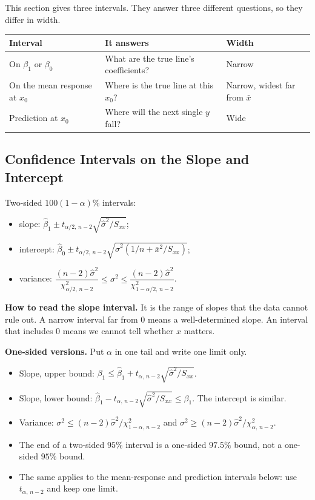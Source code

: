 This section gives three intervals. They answer three different questions, so they differ in width.

\begin{center}
\begin{tabular}{lll}
\toprule
Interval & It answers & Width\\
\midrule
On $\beta_1$ or $\beta_0$ & What are the true line's coefficients? & Narrow\\
On the mean response at $x_0$ & Where is the true line at this $x_0$? & Narrow, widest far from $\bar{x}$\\
Prediction at $x_0$ & Where will the next single $y$ fall? & Wide\\
\bottomrule
\end{tabular}
\end{center}

\subsection{Confidence Intervals on the Slope and Intercept}

\begin{theorem}\label{thm:regci}
Two-sided $100(1-\alpha)\%$ intervals:
\begin{itemize}
  \item slope: $\hat\beta_1\pm t_{\alpha/2,\,n-2}\sqrt{\hat\sigma^2/S_{xx}}$;
  \item intercept: $\hat\beta_0\pm t_{\alpha/2,\,n-2}\sqrt{\hat\sigma^2(1/n+\bar{x}^2/S_{xx})}$;
  \item variance: $\dfrac{(n-2)\hat\sigma^2}{\chi^2_{\alpha/2,\,n-2}}\le\sigma^2\le\dfrac{(n-2)\hat\sigma^2}{\chi^2_{1-\alpha/2,\,n-2}}$.
\end{itemize}
\end{theorem}

\textbf{How to read the slope interval.} It is the range of slopes that the data cannot rule out. A narrow interval far from $0$ means a well-determined slope. An interval that includes $0$ means we cannot tell whether $x$ matters.

\textbf{One-sided versions.} Put $\alpha$ in one tail and write one limit only.
\begin{itemize}
  \item Slope, upper bound: $\beta_1\le\hat\beta_1+t_{\alpha,\,n-2}\sqrt{\hat\sigma^2/S_{xx}}$.
  \item Slope, lower bound: $\hat\beta_1-t_{\alpha,\,n-2}\sqrt{\hat\sigma^2/S_{xx}}\le\beta_1$. The intercept is similar.
  \item Variance: $\sigma^2\le(n-2)\hat\sigma^2/\chi^2_{1-\alpha,\,n-2}$ and $\sigma^2\ge(n-2)\hat\sigma^2/\chi^2_{\alpha,\,n-2}$.
  \item The end of a two-sided $95\%$ interval is a one-sided $97.5\%$ bound, not a one-sided $95\%$ bound.
  \item The same applies to the mean-response and prediction intervals below: use $t_{\alpha,\,n-2}$ and keep one limit.
\end{itemize}

